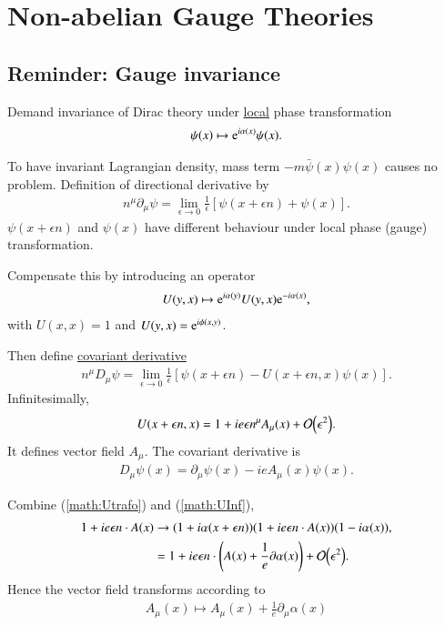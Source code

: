 \chapter{Non-abelian Gauge Theories}
\section{Reminder: Gauge invariance}
Demand invariance of Dirac theory under \underline{local} phase transformation
\begin{align*}
   \psi (x) \mapsto \mathrm{e}^{i\alpha(x)}\psi(x).
\end{align*}

To have invariant Lagrangian density, mass term $- m \bar\psi (x) \psi (x)$ causes no problem. Definition of directional derivative by
\begin{align}
   n^\mu \partial_\mu \psi = \lim_{\epsilon \rightarrow 0} \frac{1}{\epsilon} \left[ \psi(x+\epsilon n) + \psi(x) \right].
\end{align}
$\psi(x+\epsilon n )$ and $\psi(x)$ have different behaviour under local phase (gauge) transformation. 

Compensate this by introducing an operator
\begin{align}
   U(y , x) \mapsto \mathrm{e}^{i\alpha(y)} U(y,x) \mathrm{e}^{-i\alpha(x)}, \label{math:Utrafo}
\end{align}
with $U(x,x) = 1$ and $U(y,x) = \mathrm{e}^{i\phi(x,y)}$.

Then define \underline{covariant derivative}
\begin{align}
   n^\mu D_\mu \psi = \lim_{\epsilon \rightarrow 0} \frac{1}{\epsilon} \left[ \psi(x + \epsilon n ) - U(x+\epsilon n, x) \psi(x) \right].
\end{align}
Infinitesimally,
\begin{align}
   U(x+\epsilon n , x) = 1+ ie \epsilon n^\mu A_\mu (x) + \order{\epsilon^2}. \label{math:UInf}
\end{align}
It defines vector field $A_\mu$. The covariant derivative is 
\begin{align}
   D_\mu \psi (x) = \partial_\mu \psi (x) - ie A_\mu (x) \psi (x).
\end{align}

Combine (\ref{math:Utrafo}) and (\ref{math:UInf}), 
\begin{align*}
   1 + i e \epsilon n \cdot A(x) &\rightarrow ( 1 + i\alpha(x + \epsilon n)) (1 + ie \epsilon n \cdot A(x)) (1 - i\alpha(x)), \\
                                 & = 1+ ie \epsilon n \cdot  \left( A(x) + \frac{1}{e} \partial\alpha(x) \right) + \order{\epsilon^2}.
\end{align*}
Hence the vector field transforms according to
\begin{align}
   A_\mu (x) \mapsto A_\mu (x) + \frac{1}{e } \partial_\mu \alpha(x)
\end{align} 

